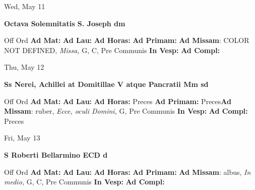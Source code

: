 \documentclass[10pt]{memoir}
\begin{document}
\begin{center}
\begin{minipage}{3.5in}
\vspace{2em}
\begin{center}Wed, May 11
\end{center}
\textbf{ \large Octava Solemnitatis S. Joseph
\textnormal{\normalsize dm}}

\begin{justify}Off Ord
\textbf{Ad Mat: }
\textbf{Ad Lau: }
\textbf{Ad Horas: }
\textbf{Ad Primam: }\textbf{Ad Missam}: COLOR NOT DEFINED, \textit{Missa,} G, C, Pre Communis
\textbf{In Vesp: }
\textbf{Ad Compl: }
\end{justify}
\end{minipage}
\end{center}

\begin{center}
\begin{minipage}{3.5in}
\vspace{2em}
\begin{center}Thu, May 12
\end{center}
\textbf{ \large Ss Nerei, Achillei at Domitillae V atque Pancratii Mm
\textnormal{\normalsize sd}}

\begin{justify}Off Ord
\textbf{Ad Mat: }
\textbf{Ad Lau: }
\textbf{Ad Horas: }Preces
\textbf{Ad Primam: }Preces\textbf{Ad Missam}: ruber, \textit{Ecce, oculi Domini,} G, Pre Communis
\textbf{In Vesp: }
\textbf{Ad Compl: }Preces
\end{justify}
\end{minipage}
\end{center}

\begin{center}
\begin{minipage}{3.5in}
\vspace{2em}
\begin{center}Fri, May 13
\end{center}
\textbf{ \large S Roberti Bellarmino ECD
\textnormal{\normalsize d}}

\begin{justify}Off Ord
\textbf{Ad Mat: }
\textbf{Ad Lau: }
\textbf{Ad Horas: }
\textbf{Ad Primam: }\textbf{Ad Missam}: albus, \textit{In medio,} G, C, Pre Communis
\textbf{In Vesp: }
\textbf{Ad Compl: }
\end{justify}
\end{minipage}
\end{center}
\end{document}
